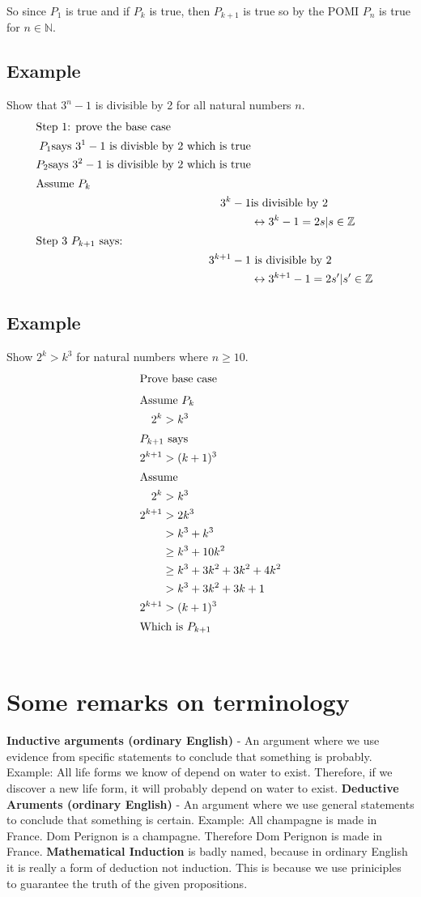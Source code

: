 So since $P_1$ is true and if $P_k$ is true, then $P_{k+1}$ is true so by the
POMI $P_n$ is true for $n \in \mathbb{N}$.


\subsection{Example}
Show that $3^n -1$ is divisible by 2 for all natural numbers $n$.
\begin{align}
\intertext{Step 1: prove the base case}
  P_1 \text{says $3^1-1$ is divisble by 2 which is true} \\
  P_2 \text{says $3^2-1$ is divisible by 2 which is true} \\
\intertext{Assume $P_k$}
  3^k - 1 & \text{is divisible by 2} \\
    & \leftrightarrow 3^k - 1 = 2s | s \in \mathbb{Z} \\
\intertext{Step 3 $P_{k+1}$ says:}
  3^{k+1} - 1 &  ~\text{is divisible by 2} \\
    & \leftrightarrow 3^{k+1} - 1 = 2s' | s' \in \mathbb{Z}
\end{align} 

\subsection{Example}
Show $2^k > k^3$ for natural numbers where $n \geq 10$.
\begin{align}
  \intertext{Prove base case}
  \intertext{Assume $P_k$}
    2^k & > k^3 \\
  \intertext{$P_{k+1}$ says}
    2^{k+1} & > (k+1)^3 \\
  \intertext{Assume}
    2^k & > k^3 \\
    2^{k+1} & > 2k^3 \\
      & > k^3 + k^3 \\
      & \geq k^3 + 10k^2 \\
      & \geq k^3 + 3k^2 + 3k^2 + 4k^2 \\
      & > k^3 + 3k^2 + 3k + 1 \\
   2^{k+1} & > (k+1)^3 \\
   \intertext{Which is $P_{k+1}$} \nonumber
\end{align}

\section{Some remarks on terminology}
\textbf{Inductive arguments (ordinary English)} - An argument where we use
evidence from specific statements to conclude that something is probably.
Example: All life forms we know of depend on water to exist. Therefore, if we
discover a new life form, it will probably depend on water to exist.
\textbf{Deductive Aruments (ordinary English)} - An argument where we use
general statements to conclude that something is certain. Example: All champagne
is made in France. Dom Perignon is a champagne. Therefore Dom Perignon is made
in France.
\textbf{Mathematical Induction} is badly named, because in ordinary English it
is really a form of deduction not induction. This is because we use priniciples
to guarantee the truth of the given propositions.

